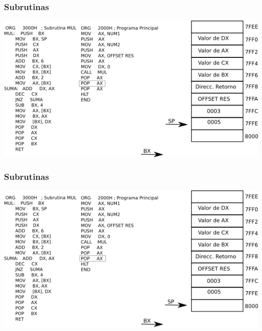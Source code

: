 \documentclass{beamer}
\begin{document}
\begin{frame}
\frametitle{Subrutinas}
\includegraphics[scale=0.70]{imgs/imagen_020.png}
\end{frame}

\begin{frame}
\frametitle{Subrutinas}
\includegraphics[scale=0.70]{imgs/imagen_021.png}
\end{frame}
\end{document}
